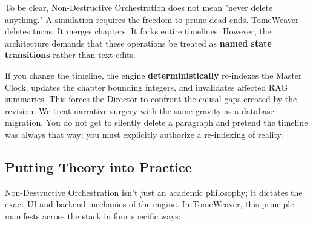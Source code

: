 \documentclass[12pt, a4paper]{article}
\begin{document}
To be clear, Non-Destructive Orchestration does not mean "never delete anything." A simulation requires the freedom to prune dead ends. TomeWeaver deletes turns. It merges chapters. It forks entire timelines. However, the architecture demands that these operations be treated as \textbf{named state transitions} rather than text edits.

If you change the timeline, the engine \textbf{deterministically} re-indexes the Master Clock, updates the chapter bounding integers, and invalidates affected RAG summaries. This forces the Director to confront the causal gaps created by the revision. We treat narrative surgery with the same gravity as a database migration. You do not get to silently delete a paragraph and pretend the timeline was always that way; you must explicitly authorize a re-indexing of reality.


\subsection{Putting Theory into Practice}

Non-Destructive Orchestration isn't just an academic philosophy; it dictates the exact UI and backend mechanics of the engine. In TomeWeaver, this principle manifests across the stack in four specific ways:
\end{document}
